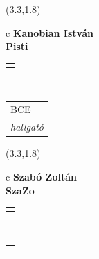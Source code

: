 \documentclass[11pt]{article}
\begin{document}
\makebox(3.3,1.8){
  \renewcommand\arraystretch{1.3}
  \begin{tabular}[c]{c}
    \hspace{8.5mm}
    \LARGE\bf{ Kanobian István }\\
    \hspace{8.5mm}
    \Large{ Pisti }\\
    \renewcommand\arraystretch{3}
    \begin{tabular}[c]{c}
      \centering
      \fontfamily{phv}\selectfont{
        \textbf{
          \textsc{
            \scriptsize{
            \color{Dark}{ Ismerkedő }\color{Bright}{ Webmester }\color{Bright}{ Sminkmester }\color{Bright}{ Programozó }
            }
          }
        }
      }
    \end{tabular}
    \\
    \renewcommand\arraystretch{1}
    \begin{tabular}{p{3.3in}}
      \hspace{.7cm}BCE\\
      \hspace{.7cm}\emph{ hallgató }\\
    \end{tabular}
  \end{tabular}
}

\makebox(3.3,1.8){
  \renewcommand\arraystretch{1.3}
  \begin{tabular}[c]{c}
    \hspace{8.5mm}
    \LARGE\bf{ Szabó Zoltán }\\
    \hspace{8.5mm}
    \Large{ SzaZo }\\
    \renewcommand\arraystretch{3}
    \begin{tabular}[c]{c}
      \centering
      \fontfamily{phv}\selectfont{
        \textbf{
          \textsc{
            \scriptsize{
            \color{Dark}{ Ismerkedő }\color{Bright}{ Webmester }\color{Bright}{ Sminkmester }\color{Bright}{ Programozó }
            }
          }
        }
      }
    \end{tabular}
    \\
    \renewcommand\arraystretch{1}
    \begin{tabular}{p{3.3in}}
      \hspace{.7cm}\\
      \hspace{.7cm}\emph{  }\\
    \end{tabular}
  \end{tabular}
}
\end{document}
